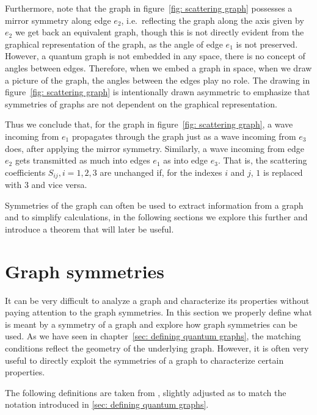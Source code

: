 Furthermore, note that the graph in figure~\ref{fig: scattering graph} possesses a mirror symmetry along edge $e_2$, i.e.\ reflecting the graph along the axis given by $e_2$ we get back an equivalent graph, though this is not directly evident from the graphical representation of the graph, as the angle of edge $e_1$ is not preserved. However, a quantum graph is not embedded in any space, there is no concept of angles between edges. Therefore, when we embed a graph in space, when we draw a picture of the graph, the angles between the edges play no role. The drawing in figure~\ref{fig: scattering graph} is intentionally drawn asymmetric to emphasize that symmetries of graphs are not dependent on the graphical representation.

Thus we conclude that, for the graph in figure~\ref{fig: scattering graph}, a wave incoming from $e_1$ propagates through the graph just as a wave incoming from $e_3$ does, after applying the mirror symmetry. Similarly, a wave incoming from edge $e_2$ gets transmitted as much into edges $e_1$ as into edge $e_3$. That is, the scattering coefficients $S_{ij}, i=1,2,3$ are unchanged if, for the indexes $i$ and $j$, $1$ is replaced with $3$ and vice versa.

Symmetries of the graph can often be used to extract information from a graph and to simplify calculations, in the following sections we explore this further and introduce a theorem that will later be useful.



\section{Graph symmetries}\label{sec: graph symmetries}

It can be very difficult to analyze a graph and characterize its properties without paying attention to the graph symmetries. In this section we properly define what is meant by a symmetry of a graph and explore how graph symmetries can be used. As we have seen in chapter~\ref{sec: defining quantum graphs}, the matching conditions reflect the geometry of the underlying graph. However, it is often very useful to directly exploit the symmetries of a graph to characterize certain properties.

The following definitions are taken from \cite{symmetries boman kurasov}, slightly adjusted as to match the notation introduced in \ref{sec: defining quantum graphs}.

